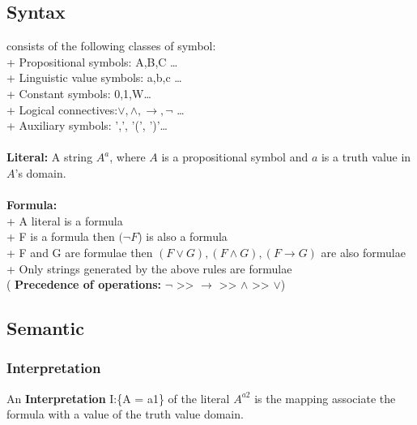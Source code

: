 \documentclass[26pt,fleqn,]{article}
\begin{document}
\subsection{Syntax}
 consists of the following classes of symbol:\\
\indent + Propositional symbols: A,B,C \ldots\\
\indent + Linguistic value symbols: a,b,c \ldots\\
\indent + Constant symbols: 0,1,W\ldots\\
\indent + Logical connectives:\(\vee,\wedge,\to,\neg\) \ldots\\
\indent + Auxiliary symbols: ',', '(', ')'\ldots\\ \\
{\bfseries Literal:} A string \(A^a\), where \(A\) is a propositional symbol and \(a\) is a truth
value in \(A\)'s domain.\\\\
 {\bfseries Formula:}\\
 \indent + A literal is a formula\\
 \indent + F is a formula then \( (\neg F\)) is also a formula\\
 \indent + F and G are formulae then \( (F\vee G), (F\wedge G), (F \to G)\) are also formulae\\
 \indent + Only strings generated by the above rules are formulae\\
 \indent ( {\bfseries Precedence of operations:} \(\neg\)  >>  \(\to\)  >>  \(\wedge\)  >>  \(\vee\))\\

\subsection{Semantic}
\subsubsection{Interpretation}
An {\bfseries Interpretation} I:\{A = a1\} of the literal \(A^{a2}\) is the mapping associate the formula
with a value of the truth value domain.\\
\end{document}
